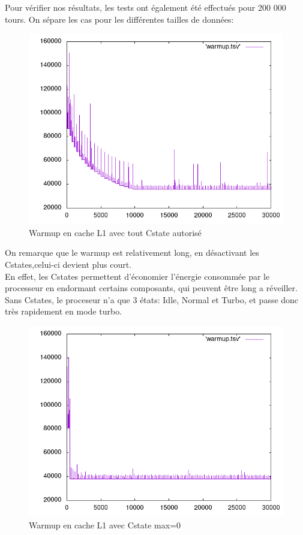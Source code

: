 \documentclass{report}
\begin{document}
Pour vérifier nos résultats, les tests ont également été effectués pour 200 000 tours.
On sépare les cas pour les différentes tailles de données:
\newpage
    \begin{figure}[ht!]
        \centering
        \includegraphics[width=120mm]{MEDIA/warmupL1_Cstate.png}
        \caption{Warmup en cache L1 avec tout Cstate autorisé}
    \end{figure}

On remarque que le warmup est relativement long, en désactivant les Cstates,celui-ci devient plus court.\\

En effet, les Cstates permettent d'économier l'énergie consommée par le processeur en endormant certains composants, qui peuvent être long a réveiller.\\

Sans Cstates, le proceseur n'a que 3 états: Idle, Normal et Turbo, et passe donc très rapidement en mode turbo.\\
\newpage
    \begin{figure}[ht!]
        \centering
        \includegraphics[width=120mm]{MEDIA/warmupL1_NOCstate.png}
        \caption{Warmup en cache L1 avec Cstate max=0}
    \end{figure}
\end{document}

